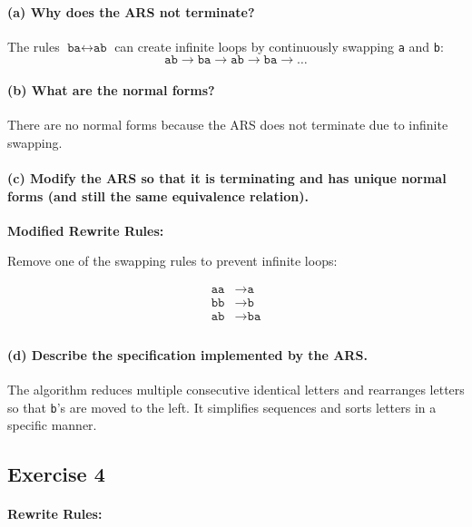 \documentclass{article}
\theoremstyle{theorem}
\theoremstyle{definition}
\theoremstyle{remark}
\begin{document}
\paragraph{(a) Why does the ARS not terminate?}

The rules \(\texttt{ba} \leftrightarrow \texttt{ab}\) can create infinite loops by continuously swapping \texttt{a} and \texttt{b}:
\[
\texttt{ab} \to \texttt{ba} \to \texttt{ab} \to \texttt{ba} \to \ldots
\]

\paragraph{(b) What are the normal forms?}

There are no normal forms because the ARS does not terminate due to infinite swapping.

\paragraph{(c) Modify the ARS so that it is terminating and has unique normal forms (and still the same equivalence relation).}

\textbf{Modified Rewrite Rules:}

Remove one of the swapping rules to prevent infinite loops:

\[
\begin{aligned}
\texttt{aa} &\to \texttt{a} \\
\texttt{bb} &\to \texttt{b} \\
\texttt{ab} &\to \texttt{ba} \\
\end{aligned}
\]

\paragraph{(d) Describe the specification implemented by the ARS.}

The algorithm reduces multiple consecutive identical letters and rearranges letters so that \texttt{b}'s are moved to the left. It simplifies sequences and sorts letters in a specific manner.

\subsection*{Exercise 4}

\paragraph{Rewrite Rules:}
\end{document}
